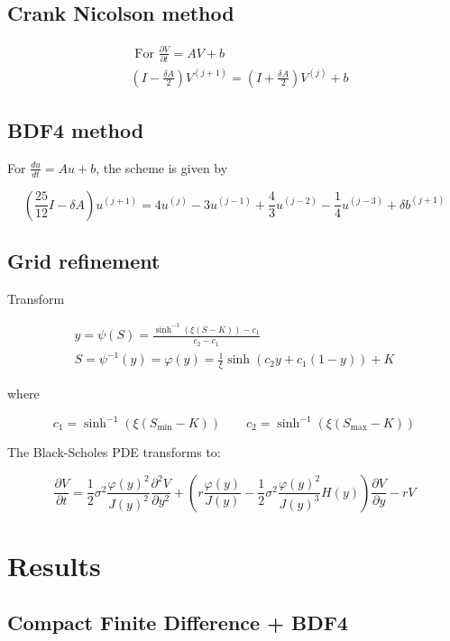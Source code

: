 \documentclass[12pt]{article}
\begin{document}
\subsection{Crank Nicolson method}

$$
\begin{aligned}
&\text { For } \frac{\partial V}{\partial t}=A V+b \\
&\left(I-\frac{\delta A}{2}\right) V^{(j+1)}=\left(I+\frac{\delta A}{2}\right) V^{(j)}+b
\end{aligned}
$$

\subsection{BDF4 method}

For $\frac{d u}{d t}=A u+b$, the scheme is given by

$$
\left(\frac{25}{12} I-\delta A\right) u^{(j+1)}=4 u^{(j)}-3 u^{(j-1)}+\frac{4}{3} u^{(j-2)}-\frac{1}{4} u^{(j-3)}+\delta b^{(j+1)}
$$



\subsection{Grid refinement}

Transform

$$
\begin{gathered}
y=\psi(S)=\frac{\sinh ^{-1}(\xi(S-K))-c_{1}}{c_{2}-c_{1}} \\
\left.S=\psi^{-1}(y)=\varphi(y)=\frac{1}{\xi} \sinh \left(c_{2} y+c_{1}(1-y)\right)+K
\end{gathered}
$$

where

$$
c_{1}=\sinh ^{-1}\left(\xi\left(S_{\min }-K\right)\right) \quad \quad c_{2}=\sinh ^{-1}\left(\xi\left(S_{\max }-K\right)\right)
$$

The Black-Scholes PDE transforms to:

$$
\frac{\partial V}{\partial t}=\frac{1}{2} \sigma^{2} \frac{\varphi(y)^{2}}{J(y)^{2}} \frac{\partial^{2} V}{\partial y^{2}}+\left(r \frac{\varphi(y)}{J(y)}-\frac{1}{2} \sigma^{2} \frac{\varphi(y)^{2}}{J(y)^{3}} H(y)\right) \frac{\partial V}{\partial y}-r V
$$

\section{Results}

\subsection{Compact Finite Difference + BDF4}
\end{document}
